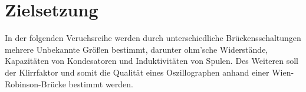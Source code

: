 \section{Zielsetzung}
\label{sec:Zielsetzung}
\nocite{V302}
In der folgenden Veruchsreihe werden durch unterschiedliche Brückensschaltungen mehrere Unbekannte 
Größen bestimmt, darunter ohm'sche Widerstände, Kapazitäten von Kondesatoren und Induktivitäten 
von Spulen. Des Weiteren soll der Klirrfaktor und somit die Qualität eines Oszillographen anhand einer Wien-Robinson-Brücke 
bestimmt werden. 
